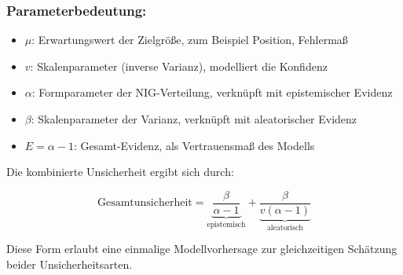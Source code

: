 \begin{otherlanguage}{ngerman}
\subsubsection*{Parameterbedeutung:}
\begin{itemize}
  \item $\mu$: Erwartungswert der Zielgröße, zum Beispiel Position, Fehlermaß
  \item $v$: Skalenparameter (inverse Varianz), modelliert die Konfidenz
  \item $\alpha$: Formparameter der NIG-Verteilung, verknüpft mit epistemischer Evidenz
  \item $\beta$: Skalenparameter der Varianz, verknüpft mit aleatorischer Evidenz
  \item $E = \alpha - 1$: Gesamt-Evidenz, als Vertrauensmaß des Modells
\end{itemize}

Die kombinierte Unsicherheit ergibt sich durch:

\begin{equation}
\text{Gesamtunsicherheit} = \underbrace{\frac{\beta}{\alpha - 1}}_{\text{epistemisch}} + \underbrace{\frac{\beta}{v(\alpha - 1)}}_{\text{aleatorisch}}
\end{equation}

Diese Form erlaubt eine einmalige Modellvorhersage zur gleichzeitigen Schätzung beider Unsicherheitsarten.  
\end{otherlanguage}







